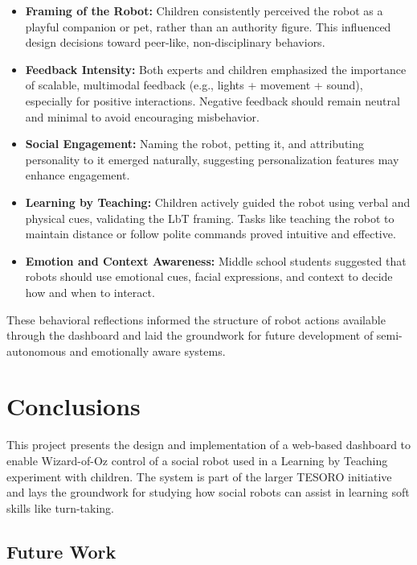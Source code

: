 \documentclass[a4paper]{usiinfbachelorproject}
\begin{document}
\begin{itemize}
    \item \textbf{Framing of the Robot:} Children consistently perceived the robot as a playful companion or pet, rather than an authority figure.
          This influenced design decisions toward peer-like, non-disciplinary behaviors.
    \item \textbf{Feedback Intensity:} Both experts and children emphasized the importance of scalable, multimodal feedback (e.g., lights + movement + sound), especially for positive interactions.
          Negative feedback should remain neutral and minimal to avoid encouraging misbehavior.
    \item \textbf{Social Engagement:} Naming the robot, petting it, and attributing personality to it emerged naturally, suggesting personalization features may enhance engagement.
    \item \textbf{Learning by Teaching:} Children actively guided the robot using verbal and physical cues, validating the LbT framing.
          Tasks like teaching the robot to maintain distance or follow polite commands proved intuitive and effective.
    \item \textbf{Emotion and Context Awareness:} Middle school students suggested that robots should use emotional cues, facial expressions, and context to decide how and when to interact.
\end{itemize}

These behavioral reflections informed the structure of robot actions available through the dashboard and laid the groundwork for future development of semi-autonomous and emotionally aware systems.

\newpage

\section{\textbf{Conclusions}}\label{sec:conclusions}
This project presents the design and implementation of a web-based dashboard to enable Wizard-of-Oz control of a social robot used in a Learning by Teaching experiment with children. The system is part of the larger TESORO initiative and lays the groundwork for studying how social robots can assist in learning soft skills like turn-taking.

\subsection{\textbf{Future Work}}




\end{document}
